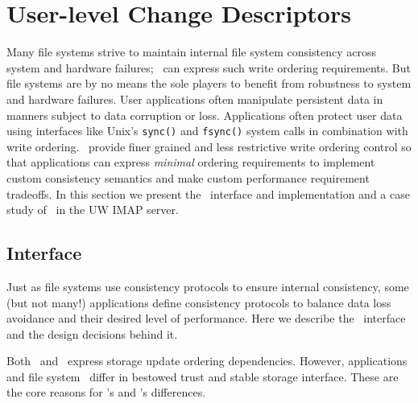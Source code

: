 \section{User-level Change Descriptors}
\label{sec:opgroup}


\newcommand{\opgroupCreate}{\texttt{opgroup\_create()}}
\newcommand{\opgroupSync}{\texttt{opgroup\_sync()}}
\newcommand{\opgroupAddDepend}{\texttt{opgroup\_add\_depend()}}
\newcommand{\opgroupEngage}{\texttt{opgroup\_engage()}}
\newcommand{\opgroupDisengage}{\texttt{opgroup\_disengage()}}
\newcommand{\opgroupRelease}{\texttt{opgroup\_release()}}
\newcommand{\opgroupAbandon}{\texttt{opgroup\_abandon()}}

Many file systems strive to maintain internal file system consistency
across system and hardware failures; \chdescs\ can express such write
ordering requirements. But file systems are by no means the sole
players to benefit from robustness to system and hardware failures.
User applications often manipulate persistent data in manners subject
to data corruption or loss. Applications often protect user data using
interfaces like Unix's \texttt{sync()} and \texttt{fsync()} system
calls in combination with write ordering. \Opgroups\ provide finer
grained and less restrictive write ordering control so that
applications can express \textit{minimal} ordering requirements to
implement custom consistency semantics and make custom performance
requirement tradeoffs. In this section we present the \opgroup\
interface and implementation and a case study of \opgroups\ in the
UW IMAP server.

\subsection{Interface}
\label{sec:opgroup:interface}
Just as file systems use consistency protocols to ensure internal
consistency, some (but not many!) applications define consistency
protocols to balance data loss avoidance and their desired level of
performance. Here we describe the \opgroup\ interface and the design
decisions behind it.

Both \opgroups\ and \chdescs\ express storage update ordering
dependencies. However, applications and file system \modules\ differ
in bestowed trust and stable storage interface. These are the core
reasons for \opgroup{}'s and \chdesc{}'s differences.

